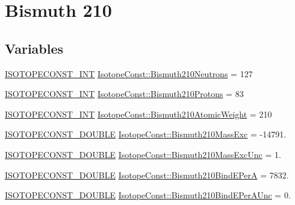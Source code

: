 \hypertarget{group___isotope_const-_bismuth-_bi210}{}\section{Bismuth 210}
\label{group___isotope_const-_bismuth-_bi210}
\subsection*{Variables}
\begin{DoxyCompactItemize}
\item 
\mbox{\hyperlink{group___isotope_const-_macros_ga5f18360b3e99483a35c32d789e62621c}{I\+S\+O\+T\+O\+P\+E\+C\+O\+N\+S\+T\+\_\+\+I\+NT}} \mbox{\hyperlink{group___isotope_const-_bismuth-_bi210_gaf5e23034ac78dc39408f66f931723523}{Isotope\+Const\+::\+Bismuth210\+Neutrons}} = 127
\item 
\mbox{\hyperlink{group___isotope_const-_macros_ga5f18360b3e99483a35c32d789e62621c}{I\+S\+O\+T\+O\+P\+E\+C\+O\+N\+S\+T\+\_\+\+I\+NT}} \mbox{\hyperlink{group___isotope_const-_bismuth-_bi210_ga84abd0d4ef0f642cfef2bca4f3f62541}{Isotope\+Const\+::\+Bismuth210\+Protons}} = 83
\item 
\mbox{\hyperlink{group___isotope_const-_macros_ga5f18360b3e99483a35c32d789e62621c}{I\+S\+O\+T\+O\+P\+E\+C\+O\+N\+S\+T\+\_\+\+I\+NT}} \mbox{\hyperlink{group___isotope_const-_bismuth-_bi210_gaab0934b4b5501a578c6172654f048c0f}{Isotope\+Const\+::\+Bismuth210\+Atomic\+Weight}} = 210
\item 
\mbox{\hyperlink{group___isotope_const-_macros_ga8f45a7272ce02c0b4c65c44636ed719a}{I\+S\+O\+T\+O\+P\+E\+C\+O\+N\+S\+T\+\_\+\+D\+O\+U\+B\+LE}} \mbox{\hyperlink{group___isotope_const-_bismuth-_bi210_ga3b7d1bb879ed2f0ae2c29d58f079119d}{Isotope\+Const\+::\+Bismuth210\+Mass\+Exc}} = -\/14791.
\item 
\mbox{\hyperlink{group___isotope_const-_macros_ga8f45a7272ce02c0b4c65c44636ed719a}{I\+S\+O\+T\+O\+P\+E\+C\+O\+N\+S\+T\+\_\+\+D\+O\+U\+B\+LE}} \mbox{\hyperlink{group___isotope_const-_bismuth-_bi210_ga482a419e5bd063caf5eefabc0a7b4714}{Isotope\+Const\+::\+Bismuth210\+Mass\+Exc\+Unc}} = 1.
\item 
\mbox{\hyperlink{group___isotope_const-_macros_ga8f45a7272ce02c0b4c65c44636ed719a}{I\+S\+O\+T\+O\+P\+E\+C\+O\+N\+S\+T\+\_\+\+D\+O\+U\+B\+LE}} \mbox{\hyperlink{group___isotope_const-_bismuth-_bi210_ga3ea677ff74e6de5ad874be0bbfbea67b}{Isotope\+Const\+::\+Bismuth210\+Bind\+E\+PerA}} = 7832.
\item 
\mbox{\hyperlink{group___isotope_const-_macros_ga8f45a7272ce02c0b4c65c44636ed719a}{I\+S\+O\+T\+O\+P\+E\+C\+O\+N\+S\+T\+\_\+\+D\+O\+U\+B\+LE}} \mbox{\hyperlink{group___isotope_const-_bismuth-_bi210_ga4261a06eefd74c30cf753d611900d740}{Isotope\+Const\+::\+Bismuth210\+Bind\+E\+Per\+A\+Unc}} = 0.

\end{DoxyCompactItemize}
